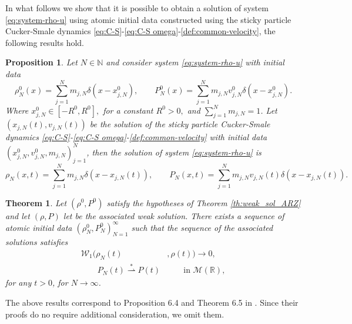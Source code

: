 \documentclass[11pt,a4paper,oneside]{amsart}
\newtheorem{theorem}[definition]{Theorem}
\newtheorem{prop}[definition]{Proposition}
\newcommand\R{\mathbb{R}}
\newcommand\N{\mathbb{N}}
\newcommand{\MM}{\mathcal{M}}
\newcommand{\WW}{\mathcal{W}}
\newcommand\weakstar{\overset{\ast}{\rightharpoonup}}
\begin{document}
In what follows we show that it is possible to obtain a solution of system \eqref{eq:system-rho-u} using atomic initial data constructed 
using the sticky particle Cucker-Smale dynamics \eqref{eq:C-S}-\eqref{eq:C-S omega}-\eqref{def:common-velocity}, {\color{black} the following results hold}. 
\begin{prop}
    Let $N\in\N$ and consider system \eqref{eq:system-rho-u} with initial data
    $$
    \rho_N^0(x)=\sum_{j=1}^N m_{j,N}\delta(x-x_{j,N}^0),\qquad P_N^0(x)=\sum_{j=1}^N m_{j,N}v_{j,N}^0\delta(x-x_{j,N}^0).
    $$
Where $x_{j,N}^0\in [-R^0,R^0],$ for a constant $R^0>0,$ and $\sum_{j=1}^N m_{j,N}=1$. 
Let $(x_{j,N}(t),v_{j,N}(t))$ be the solution of the sticky particle Cucker-Smale dynamics \eqref{eq:C-S}-\eqref{eq:C-S omega}-\eqref{def:common-velocity} 
with initial data $(x_{j,N}^0,v_{j,N}^0,m_{j,N})_{j=1}^N$, then the solution of system \eqref{eq:system-rho-u} is
    $$
    \rho_N(x,t)=\sum_{j=1}^N m_{j,N}\delta(x-x_{j,N}(t)),\qquad P_N(x,t)=\sum_{j=1}^N m_{j,N}v_{j,N}(t)\delta(x-x_{j,N}(t)).
    $$
\end{prop}
\begin{theorem}
    Let $(\rho^0,P^0)$ satisfy the hypotheses of Theorem \ref{th:weak_sol_ARZ} and let $(\rho,P)$ let be the associated weak solution. 
    There exists a sequence of atomic initial data $(\rho_N^0,P_N^0)_{N=1}^\infty$ such that the sequence of the associated solutions satisfies
    \begin{align*}
    \WW_1(\rho_N(t) & ,\rho(t))\to 0,\\
    \qquad P_N(t) \weakstar P(t) & \qquad\text{in $\MM(\R)$},
    \end{align*}
    for any $t>0$, for $N\to\infty$.
\end{theorem}
{\color{black} The above results correspond to Proposition 6.4 and Theorem 6.5 in \cite{Leslie-Tan}. Since their proofs do no require additional consideration, we omit them.}

\appendix
\end{document}
